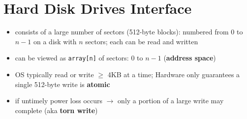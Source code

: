\section*{Hard Disk Drives Interface}
\begin{itemize}
\item consists of a large number of sectors (512-byte blocks): numbered from 0 to $n-1$ on a disk with $n$ sectors; each can be read and written
\item can be viewed as \texttt{array[n]} of sectors: 0 to $n-1$ (\textbf{address space})
\item OS typically read or write $\geq$ 4KB at a time; Hardware only guarantees a single 512-byte write is \textbf{atomic}
\item if untimely power loss occurs $\to$ only a portion of a large write may complete (aka \textbf{torn write})
\end{itemize}

